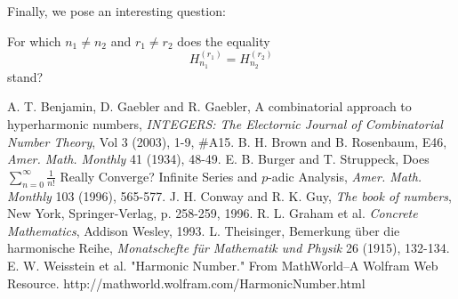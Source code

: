 \documentclass[a4paper,12pt]{amsart}
\begin{document}
Finally, we pose an interesting question:

\begin{Problem}For which $n_1\neq n_2$ and $r_1\neq r_2$ does the equality
\[H_{n_1}^{(r_1)}=H_{n_2}^{(r_2)}\]
stand?
\end{Problem}

\newpage

\begin{thebibliography}{AAAAAA}
A. T. Benjamin, D. Gaebler and R. Gaebler, A combinatorial approach to hyperharmonic numbers, \emph{INTEGERS: The Electornic Journal of Combinatorial Number Theory}, Vol 3 (2003), 1-9, \#A15.
B. H. Brown and B. Rosenbaum, E46, \emph{Amer. Math. Monthly} 41 (1934), 48-49.
E. B. Burger and T. Struppeck, Does $\sum_{n=0}^\infty\frac{1}{n!}$ Really Converge? Infinite Series and $p$-adic Analysis, \emph{Amer. Math. Monthly} 103 (1996), 565-577.
J. H. Conway and R. K. Guy, \emph{The book of numbers}, New York, Springer-Verlag, p. 258-259, 1996.
R. L. Graham et al. \emph{Concrete Mathematics}, Addison Wesley, 1993.
L. Theisinger, Bemerkung \"uber die harmonische Reihe, \emph{Monatschefte f\"ur Mathematik und Physik} 26 (1915), 132-134.
E. W. Weisstein et al. "Harmonic Number." From MathWorld--A Wolfram Web Resource. http://mathworld.wolfram.com/Harmo\-nicNumber.html 
\end{thebibliography}
\end{document}
